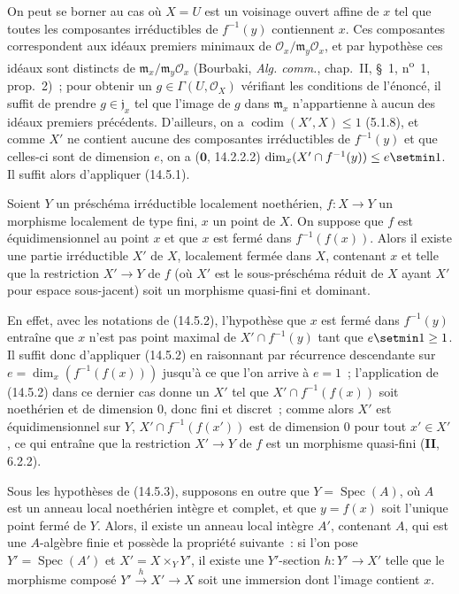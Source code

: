 
On peut se borner au cas où $X=U$ est un voisinage ouvert affine de $x$ tel que
toutes les composantes irréductibles de $f^{-1}(y)$ contiennent $x$. Ces
composantes correspondent aux idéaux premiers minimaux de
$\mathcal O_x/\mathfrak m_y\mathcal O_x$, et par hypothèse ces idéaux sont
distincts de $\mathfrak m_x/\mathfrak m_y\mathcal O_x$ (Bourbaki,
\emph{Alg. comm.}, chap.~II, \S~1, n\textsuperscript{o}~1, prop.~2)~; pour obtenir
un $g\in\Gamma(U,\mathcal O_X)$ vérifiant les conditions de l'énoncé, il suffit de
prendre $g\in\mathfrak j_x$ tel que l'image de $g$ dans $\mathfrak m_x$
n'appartienne à aucun des idéaux premiers précédents. D'ailleurs, on a
$\operatorname{codim}(X',X)\leq 1$ (5.1.8), et comme $X'$ ne contient aucune des composantes
irréductibles de $f^{-1}(y)$ et que celles-ci sont de dimension $e$, on a
($\mathbf 0$, 14.2.2.2) $\dim_x(X'\cap f^{-1}(y))\leq e\setmin 1$. Il suffit alors
d'appliquer (14.5.1).

\begin{proposition}[14.5.3]
\label{IV.14.5.3-fr}
Soient $Y$ un préschéma irréductible localement noethérien, $f:X\to Y$ un
morphisme localement de type fini, $x$ un point de $X$. On suppose que $f$ est
équidimensionnel au point $x$ et que $x$ est fermé dans $f^{-1}(f(x))$. Alors il
existe une partie irréductible $X'$ de $X$, localement fermée dans $X$, contenant
$x$ et telle que la restriction $X'\to Y$ de $f$ \textup{(où $X'$ est le sous-préschéma
réduit de $X$ ayant $X'$ pour espace sous-jacent)} soit un morphisme quasi-fini et
dominant.
\end{proposition}

En effet, avec les notations de (14.5.2), l'hypothèse que $x$ est fermé dans
$f^{-1}(y)$ entraîne que $x$ n'est pas point maximal de $X'\cap f^{-1}(y)$ tant
que $e\setmin 1\geq 1$. Il suffit donc d'appliquer (14.5.2) en raisonnant par récurrence
descendante sur $e=\dim_x(f^{-1}(f(x)))$ jusqu'à ce que l'on arrive à $e=1$~;
l'application de (14.5.2) dans ce dernier cas donne un $X'$ tel que
$X'\cap f^{-1}(f(x))$ soit noethérien et de dimension 0, donc fini et discret~;
comme alors $X'$ est équidimensionnel sur $Y$, $X'\cap f^{-1}(f(x'))$ est de
dimension 0 pour tout $x'\in X'$, ce qui entraîne que la restriction $X'\to Y$ de
$f$ est un morphisme quasi-fini (\textbf{II}, 6.2.2).

\begin{corollary}[14.5.4]
\label{IV.14.5.4-fr}
Sous les hypothèses de \textup{(14.5.3)}, supposons en outre que $Y=\operatorname{Spec}(A)$, où $A$ est
un anneau local noethérien intègre et \textup{complet}, et que $y=f(x)$ soit l'unique point
fermé de $Y$. Alors, il existe un anneau local intègre $A'$, contenant $A$, qui est
une $A$-algèbre finie et possède la propriété suivante~: si l'on pose
$Y'=\operatorname{Spec}(A')$ et $X'=X\times_Y Y'$, il existe une $Y'$-section $h:Y'\to X'$ telle
que le morphisme composé $Y'\xrightarrow{h}X'\to X$ soit une immersion dont
l'image contient $x$.
\end{corollary}

